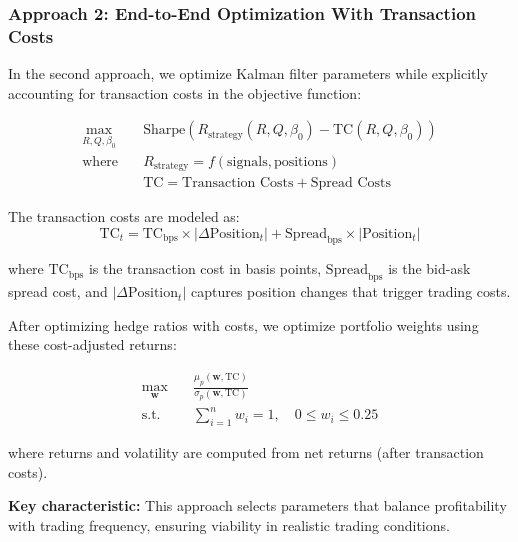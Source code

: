 
\subsubsection{Approach 2: End-to-End Optimization With Transaction Costs}

In the second approach, we optimize Kalman filter parameters while explicitly accounting for transaction costs in the objective function:

\begin{align}
\max_{R, Q, \beta_0} \quad & \text{Sharpe}(R_{\text{strategy}}(R, Q, \beta_0) - \text{TC}(R, Q, \beta_0)) \\
\text{where} \quad & R_{\text{strategy}} = f(\text{signals}, \text{positions}) \\
& \text{TC} = \text{Transaction Costs} + \text{Spread Costs}
\end{align}

The transaction costs are modeled as:
\begin{equation}
\text{TC}_t = \text{TC}_{\text{bps}} \times |\Delta \text{Position}_t| + \text{Spread}_{\text{bps}} \times |\text{Position}_t|
\end{equation}

where $\text{TC}_{\text{bps}}$ is the transaction cost in basis points, $\text{Spread}_{\text{bps}}$ is the bid-ask spread cost, and $|\Delta \text{Position}_t|$ captures position changes that trigger trading costs.

After optimizing hedge ratios with costs, we optimize portfolio weights using these cost-adjusted returns:

\begin{align}
\max_{\mathbf{w}} \quad & \frac{\mu_p(\mathbf{w}, \text{TC})}{\sigma_p(\mathbf{w}, \text{TC})} \\
\text{s.t.} \quad & \sum_{i=1}^{n} w_i = 1, \quad 0 \leq w_i \leq 0.25
\end{align}

where returns and volatility are computed from net returns (after transaction costs).

\textbf{Key characteristic:} This approach selects parameters that balance profitability with trading frequency, ensuring viability in realistic trading conditions.

